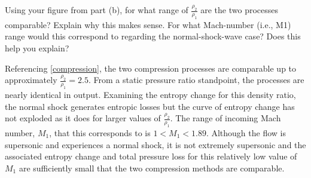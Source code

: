 \documentclass[../main.tex]{subfiles}
\begin{document}
\newpage


Using your figure from part (b), for what range of \(\frac{\rho_2}{\rho_1}\) are the two processes comparable?
Explain why this makes sense. 
For what Mach-number (i.e., M1) range would this correspond to regarding the normal-shock-wave case? 
Does this help you explain?

\discussion{}

Referencing \ref{compression}, the two compression processes are comparable up to approximately \(\frac{\rho_2}{\rho_1} = 2.5\).
From a static pressure ratio standpoint, the processes are nearly identical in output.
Examining the entropy change for this density ratio, the normal shock generates entropic losses but the curve of entropy change has not exploded as it does for larger values of \(\frac{\rho_2}{\rho_1}\).
The range of incoming Mach number, \(M_1\), that this corresponds to is \(1 < M_1 < 1.89\).
Although the flow is supersonic and experiences a normal shock, it is not extremely supersonic and the associated entropy change and total pressure loss for this relatively low value of \(M_1\) are sufficiently small that the two compression methods are comparable.
 
\end{document}
